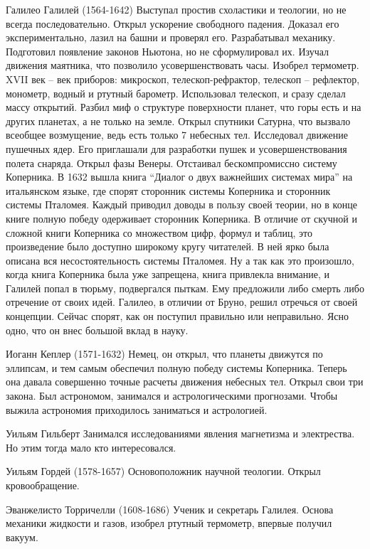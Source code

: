 Галилео Галилей (1564-1642) Выступал простив схоластики и теологии, но не всегда последовательно. Открыл ускорение свободного падения. Доказал его экспериментально, лазил на башни и проверял его. Разрабатывал механику. Подготовил появление законов Ньютона, но не сформулировал их. Изучал движения маятника, что позволило усовершенствовать часы. Изобрел термометр. XVII век – век приборов: микроскоп, телескоп-рефрактор, телескоп – рефлектор, монометр, водный и ртутный барометр. Использовал телескоп, и сразу сделал массу открытий. Разбил миф о структуре поверхности планет, что горы есть и на других планетах, а не только на земле. Открыл спутники Сатурна, что вызвало всеобщее возмущение, ведь есть только 7 небесных тел. Исследовал движение пушечных ядер. Его приглашали для разработки пушек и усовершенствования полета снаряда. Открыл фазы Венеры. Отстаивал бескомпромиссно систему Коперника. В 1632 вышла книга “Диалог о двух важнейших системах мира” на итальянском языке, где спорят сторонник системы Коперника и сторонник системы Пталомея. Каждый приводил доводы в пользу своей теории, но в конце книге полную победу одерживает сторонник Коперника. В отличие от скучной и сложной книги Коперника со множеством цифр, формул и таблиц, это произведение было доступно широкому кругу читателей. В ней ярко была описана вся несостоятельность системы Пталомея. Ну а так как это произошло, когда книга Коперника была уже запрещена, книга привлекла внимание, и Галилей попал в тюрьму, подвергался пыткам. Ему предложили либо смерть либо отречение от своих идей. Галилео, в отличии от Бруно, решил отречься от своей концепции. Сейчас спорят, как он поступил правильно или неправильно. Ясно одно, что он внес большой вклад в науку.

Иоганн Кеплер (1571-1632) Немец, он открыл, что планеты движутся по эллипсам, и тем самым обеспечил полную победу системы Коперника. Теперь она давала совершенно точные расчеты движения небесных тел. Открыл свои три закона. Был астрономом, занимался и астрологическими прогнозами. Чтобы выжила астрономия приходилось заниматься и астрологией.

Уильям Гильберт Занимался исследованиями явления магнетизма и электрества. Но этим тогда мало кто интересовался.

Уильям Гордей (1578-1657) Основоположник научной теологии. Открыл кровообращение.

Эванжелисто Торричелли (1608-1686)
Ученик и секретарь Галилея. Основа механики жидкости и газов, изобрел ртутный термометр, впервые получил вакуум.

